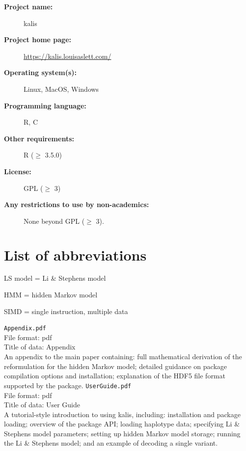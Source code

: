 \documentclass[pdflatex,referee,lineno,sn-nature]{sn-jnl}%
\let\proglang=\textsf
\newcommand{\pkg}[1]{{\fontseries{m}\fontseries{b}\selectfont #1}}
\begin{document}
\begin{description}
	\item[\textbf{Project name:}] \pkg{kalis}
	\item[\textbf{Project home page:}] \url{https://kalis.louisaslett.com/}
	\item[\textbf{Operating system(s):}] Linux, MacOS, Windows
	\item[\textbf{Programming language:}] \proglang{R}, \proglang{C}
	\item[\textbf{Other requirements:}] R ($\geq$ 3.5.0)
	\item[\textbf{License:}] GPL ($\geq$ 3)
	\item[\textbf{Any restrictions to use by non-academics:}] None beyond GPL ($\geq$ 3).
\end{description}



\section*{List of abbreviations}

\noindent
LS model = Li \& Stephens model

\noindent
HMM = hidden Markov model

\noindent
SIMD = single instruction, multiple data



\backmatter


\texttt{Appendix.pdf}\\
File format: pdf \\
Title of data: Appendix \\
An appendix to the main paper containing: full mathematical derivation of the reformulation for the hidden Markov model; detailed guidance on package compilation options and installation; explanation of the HDF5 file format supported by the package.
\texttt{UserGuide.pdf}\\
File format: pdf \\
Title of data: User Guide \\
A tutorial-style introduction to using \pkg{kalis}, including: installation and package loading; overview of the package API; loading haplotype data; specifying Li \& Stephens model parameters; setting up hidden Markov model storage; running the Li \& Stephens model; and an example of decoding a single variant.
\end{document}
